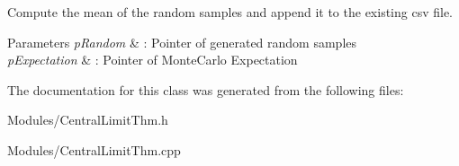 Compute the mean of the random samples and append it to the existing csv file. 


\begin{DoxyParams}{Parameters}
{\em p\+Random} & \+: Pointer of generated random samples \\
\hline
{\em p\+Expectation} & \+: Pointer of Monte\+Carlo Expectation \\
\hline
\end{DoxyParams}


The documentation for this class was generated from the following files\+:\begin{DoxyCompactItemize}
\item 
Modules/Central\+Limit\+Thm.\+h\item 
Modules/Central\+Limit\+Thm.\+cpp\end{DoxyCompactItemize}
